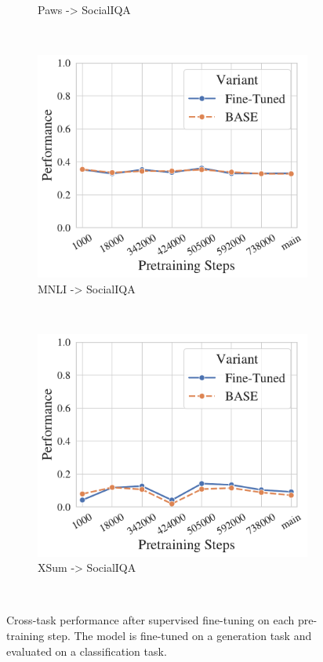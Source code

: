 \begin{figure}[t!]
\begin{subfigure}[b]{0.3\textwidth}
        \caption{Paws -> SocialIQA}
    \end{subfigure}%
    ~ 
    \begin{subfigure}[b]{0.3\textwidth}
    \includegraphics[width=\the\columnwidth]{figures/fig_files/cross-task/sft_evalmnli_matched-trainsocialiqa.pdf}
        \caption{MNLI -> SocialIQA}
    \end{subfigure}%
    ~ 
    \begin{subfigure}[b]{0.3\textwidth}
    \includegraphics[width=\the\columnwidth]{figures/fig_files/cross-task/sft_evalxsum-trainsocialiqa.pdf}
        \caption{XSum -> SocialIQA}
    \end{subfigure}%
    \\
    \caption{Cross-task performance after supervised fine-tuning on each pre-training step. The model is fine-tuned on a generation task and evaluated on a classification task.}
    \label{fig:cross-task-ckpt-perf-gen}
\end{figure}